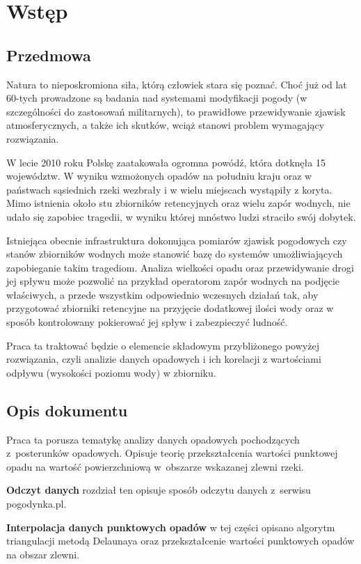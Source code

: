 \chapter{Wstęp}
\section{Przedmowa}
Natura to nieposkromiona siła, którą człowiek stara się poznać. Choć już od lat 60-tych prowadzone są badania nad systemami modyfikacji pogody (w szczególności do zastosowań militarnych), to prawidłowe przewidywanie zjawisk atmosferycznych, a także ich skutków, wciąż stanowi problem wymagający rozwiązania.

W lecie 2010 roku Polskę zaatakowała ogromna powódź, która dotknęła 15 województw. W wyniku wzmożonych opadów na południu kraju oraz w państwach sąsiednich rzeki wezbrały i w wielu miejscach wystąpiły z koryta. Mimo istnienia około stu zbiorników retencyjnych oraz wielu zapór wodnych, nie udało się zapobiec tragedii, w wyniku której mnóstwo ludzi straciło swój dobytek.

Istniejąca obecnie infrastruktura dokonująca pomiarów zjawisk pogodowych czy stanów zbiorników wodnych może stanowić bazę do systemów umożliwiających zapobieganie takim tragediom. Analiza wielkości opadu oraz przewidywanie drogi jej spływu może pozwolić na przykład operatorom zapór wodnych na podjęcie właściwych, a przede wszystkim odpowiednio wczesnych działań tak, aby przygotować zbiorniki retencyjne na przyjęcie dodatkowej ilości wody oraz w sposób kontrolowany pokierować jej spływ i zabezpieczyć ludność.

Praca ta traktować będzie o elemencie składowym przybliżonego powyżej rozwiązania, czyli analizie danych opadowych i ich korelacji z wartościami odpływu (wysokości poziomu wody) w zbiorniku.
\section{Opis dokumentu}
Praca ta porusza tematykę analizy danych opadowych pochodzących z~posterunków opadowych. Opisuje teorię przekształcenia wartości punktowej opadu na wartość powierzchniową w~obszarze wskazanej zlewni rzeki.

\textbf{Odczyt danych} rozdział ten opisuje sposób odczytu danych z~serwisu pogodynka.pl.

\textbf{Interpolacja danych punktowych opadów} w tej części opisano algorytm triangulacji metodą Delaunaya oraz przekształcenie wartości punktowych opadów na obszar zlewni.

